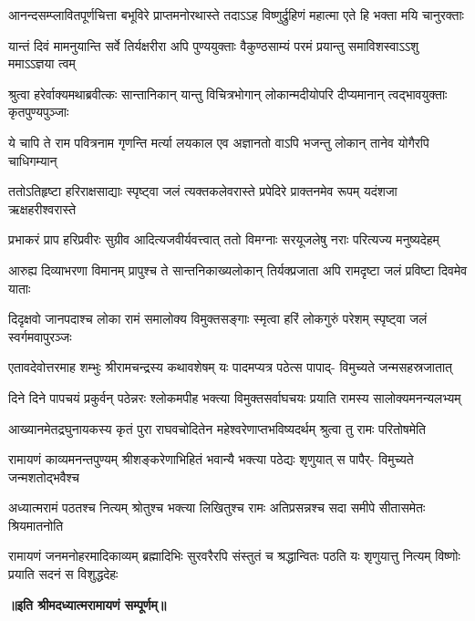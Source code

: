 \fourlineindentedshloka
{आनन्दसम्प्लावितपूर्णचित्ता}
{बभूविरे प्राप्तमनोरथास्ते}
{तदाऽऽह विष्णुर्द्रुहिणं महात्मा}
{एते हि भक्ता मयि चानुरक्ताः} %

\fourlineindentedshloka
{यान्तं दिवं मामनुयान्ति सर्वे}
{तिर्यक्षरीरा अपि पुण्ययुक्ताः}
{वैकुण्ठसाम्यं परमं प्रयान्तु}
{समाविशस्वाऽऽशु ममाऽऽज्ञया त्वम्} %

\fourlineindentedshloka
{श्रुत्वा हरेर्वाक्यमथाब्रवीत्कः}
{सान्तानिकान् यान्तु विचित्रभोगान्}
{लोकान्मदीयोपरि दीप्यमानान्}
{त्वद्भावयुक्ताः कृतपुण्यपुञ्जाः} %

\fourlineindentedshloka
{ये चापि ते राम पवित्रनाम}
{गृणन्ति मर्त्या लयकाल एव}
{अज्ञानतो वाऽपि भजन्तु लोकान्}
{तानेव योगैरपि चाधिगम्यान्} %

\fourlineindentedshloka
{ततोऽतिहृष्टा हरिराक्षसाद्याः}
{स्पृष्ट्वा जलं त्यक्तकलेवरास्ते}
{प्रपेदिरे प्राक्तनमेव रूपम्}
{यदंशजा ऋक्षहरीश्वरास्ते} %

\fourlineindentedshloka
{प्रभाकरं प्राप हरिप्रवीरः}
{सुग्रीव आदित्यजवीर्यवत्त्वात्}
{ततो विमग्नाः सरयूजलेषु}
{नराः परित्यज्य मनुष्यदेहम्} %

\fourlineindentedshloka
{आरुह्य दिव्याभरणा विमानम्}
{प्रापुश्च ते सान्तनिकाख्यलोकान्}
{तिर्यक्प्रजाता अपि रामदृष्टा}
{जलं प्रविष्टा दिवमेव याताः} %

\fourlineindentedshloka
{दिदृक्षवो जानपदाश्च लोका}
{रामं समालोक्य विमुक्तसङ्गाः}
{स्मृत्वा हरिं लोकगुरुं परेशम्}
{स्पृष्ट्वा जलं स्वर्गमवापुरञ्जः} %

\fourlineindentedshloka
{एतावदेवोत्तरमाह शम्भुः}
{श्रीरामचन्द्रस्य कथावशेषम्}
{यः पादमप्यत्र पठेत्स पापाद्-}
{विमुच्यते जन्मसहस्रजातात्} %

\fourlineindentedshloka
{दिने दिने पापचयं प्रकुर्वन्}
{पठेन्नरः श्लोकमपीह भक्त्या}
{विमुक्तसर्वाघचयः प्रयाति}
{रामस्य सालोक्यमनन्यलभ्यम्} %

\fourlineindentedshloka
{आख्यानमेतद्रघुनायकस्य}
{कृतं पुरा राघवचोदितेन}
{महेश्वरेणाप्तभविष्यदर्थम्}
{श्रुत्वा तु रामः परितोषमेति} %

\fourlineindentedshloka
{रामायणं काव्यमनन्तपुण्यम्}
{श्रीशङ्करेणाभिहितं भवान्यै}
{भक्त्या पठेद्यः शृणुयात् स पापैर्-}
{विमुच्यते जन्मशतोद्भवैश्च} %

\fourlineindentedshloka
{अध्यात्मरामं पठतश्च नित्यम्}
{श्रोतुश्च भक्त्या लिखितुश्च रामः}
{अतिप्रसन्नश्च सदा समीपे}
{सीतासमेतः श्रियमातनोति} %

\fourlineindentedshloka
{रामायणं जनमनोहरमादिकाव्यम्}
{ब्रह्मादिभिः सुरवरैरपि संस्तुतं च}
{श्रद्धान्वितः पठति यः शृणुयात्तु नित्यम्}
{विष्णोः प्रयाति सदनं स विशुद्धदेहः} %



\textbf{॥इति श्रीमदध्यात्मरामायणं सम्पूर्णम्॥}
